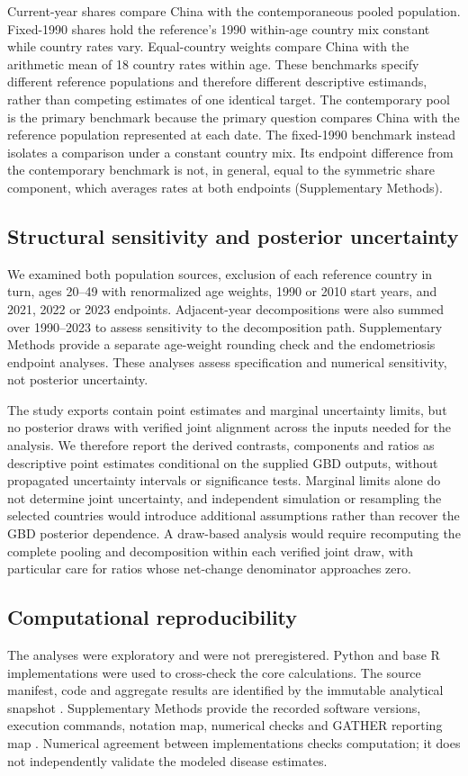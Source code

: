 \documentclass[11pt,a4paper]{article}
\begin{document}
Current-year shares compare China with the contemporaneous pooled population. Fixed-1990 shares hold the reference's 1990 within-age country mix constant while country rates vary. Equal-country weights compare China with the arithmetic mean of 18 country rates within age. These benchmarks specify different reference populations and therefore different descriptive estimands, rather than competing estimates of one identical target. The contemporary pool is the primary benchmark because the primary question compares China with the reference population represented at each date. The fixed-1990 benchmark instead isolates a comparison under a constant country mix. Its endpoint difference from the contemporary benchmark is not, in general, equal to the symmetric share component, which averages rates at both endpoints (Supplementary Methods).

\subsection{Structural sensitivity and posterior uncertainty}
We examined both population sources, exclusion of each reference country in turn, ages 20--49 with renormalized age weights, 1990 or 2010 start years, and 2021, 2022 or 2023 endpoints. Adjacent-year decompositions were also summed over 1990--2023 to assess sensitivity to the decomposition path. Supplementary Methods provide a separate age-weight rounding check and the endometriosis endpoint analyses. These analyses assess specification and numerical sensitivity, not posterior uncertainty.

The study exports contain point estimates and marginal uncertainty limits, but no posterior draws with verified joint alignment across the inputs needed for the analysis. We therefore report the derived contrasts, components and ratios as descriptive point estimates conditional on the supplied GBD outputs, without propagated uncertainty intervals or significance tests. Marginal limits alone do not determine joint uncertainty, and independent simulation or resampling the selected countries would introduce additional assumptions rather than recover the GBD posterior dependence. A draw-based analysis would require recomputing the complete pooling and decomposition within each verified joint draw, with particular care for ratios whose net-change denominator approaches zero.

\subsection{Computational reproducibility}
The analyses were exploratory and were not preregistered. Python and base R implementations were used to cross-check the core calculations. The source manifest, code and aggregate results are identified by the immutable analytical snapshot \citep{repository}. Supplementary Methods provide the recorded software versions, execution commands, notation map, numerical checks and GATHER reporting map \citep{gather}. Numerical agreement between implementations checks computation; it does not independently validate the modeled disease estimates.
\end{document}
